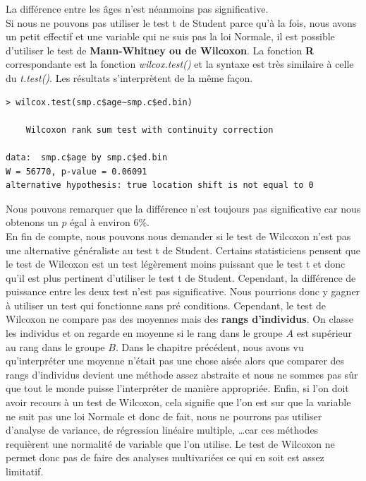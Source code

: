 La différence entre les âges n'est néanmoins pas significative.\newline
\\
Si nous ne pouvons pas utiliser le test t de Student parce qu'à la fois, nous avons un petit effectif et une variable qui ne suis pas la loi Normale, il est possible d'utiliser le test de \textbf{Mann-Whitney ou de Wilcoxon}.\newline
La fonction \textbf{R} correspondante est la fonction \textit{wilcox.test()} et la syntaxe est très similaire à celle du \textit{t.test()}. Les résultats s'interprètent de la même façon.
\begin{lstlisting}[language=html]
> wilcox.test(smp.c$age~smp.c$ed.bin)

	Wilcoxon rank sum test with continuity correction

data:  smp.c$age by smp.c$ed.bin
W = 56770, p-value = 0.06091
alternative hypothesis: true location shift is not equal to 0
\end{lstlisting}
Nous pouvons remarquer que la différence n'est toujours pas significative car nous obtenons un $p$ égal à environ $6\%$.\newline
\\
En fin de compte, nous pouvons nous demander si le test de Wilcoxon n'est pas une alternative généraliste au test t de Student.\newline
Certains statisticiens pensent que le test de Wilcoxon est un test légèrement moins puissant que le test t et donc qu'il est plus pertinent d'utiliser le test t de Student. Cependant, la différence de puissance entre les deux test n'est pas significative. Nous pourrions donc y gagner à utiliser un test qui fonctionne sans pré conditions.\newline
Cependant, le test de Wilcoxon ne compare pas des moyennes mais des \textbf{rangs d'individus}. On classe les individus et on regarde en moyenne si le rang dans le groupe $A$ est supérieur au rang dans le groupe $B$. Dans le chapitre précédent, nous avons vu qu'interpréter une moyenne n'était pas une chose aisée alors que comparer des rangs d'individus devient une méthode assez abstraite et nous ne sommes pas sûr que tout le monde puisse l'interpréter de manière appropriée.\newline
Enfin, si l'on doit avoir recours à un test de Wilcoxon, cela signifie que l'on est sur que la variable ne suit pas une loi Normale et donc de fait, nous ne pourrons pas utiliser d'analyse de variance, de régression linéaire multiple, \dots car ces méthodes requièrent une normalité de variable que l'on utilise.\newline
Le test de Wilcoxon ne permet donc pas de faire des analyses multivariées ce qui en soit est assez limitatif.
\newpage 

